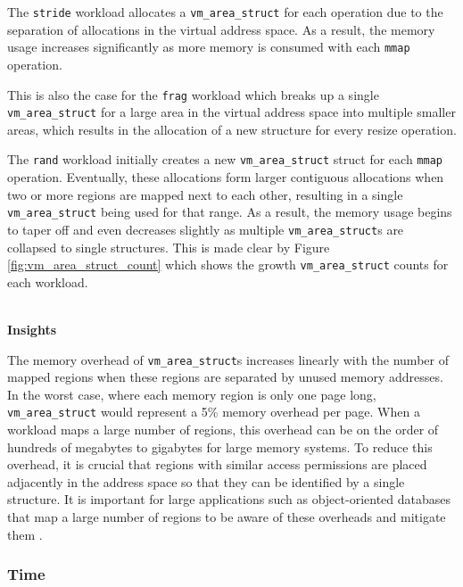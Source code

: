 \documentclass[twocolumn,11pt]{article}
\begin{document}
The \texttt{stride} workload allocates a
\texttt{vm\_area\_struct} for each operation due to the separation of
allocations in the virtual address space. As a result, the memory usage
increases significantly as more memory is consumed with each \texttt{mmap} operation.

This is also the case for the \texttt{frag} workload which breaks up a single
\texttt{vm\_area\_struct} for a large area in the virtual address space into
multiple smaller areas, which results in the allocation of a new structure for
every resize operation. 

The \texttt{rand} workload initially creates a new
\texttt{vm\_area\_struct} struct for each \texttt{mmap} operation. Eventually, these
allocations form larger contiguous allocations when two or more regions are
mapped next to each other, resulting in a single \texttt{vm\_area\_struct} being
used for that range. As a result, the memory usage begins to taper off and
even decreases slightly as multiple \texttt{vm\_area\_struct}s are collapsed to
single structures. This is made clear by Figure \ref{fig:vm_area_struct_count}
which shows the growth \texttt{vm\_area\_struct} counts for each workload.

~\\ \textbf{Insights}

The memory overhead of \texttt{vm\_area\_struct}s increases linearly with the
number of mapped regions when these regions are separated by unused memory
addresses. In the worst case, where each memory region is only one page long, \texttt{vm\_area\_struct} would represent a 5\% memory overhead per page. When a workload maps a large number of regions, this overhead can be
on the order of hundreds of megabytes to gigabytes for large memory systems.  To
reduce this overhead, it is crucial that regions with similar access permissions
are placed adjacently in the address space so that they can be identified by a
single structure. It is important for large applications such as object-oriented
databases that map a large number of regions to be aware of these overheads and mitigate them \cite{utlk}.

\subsubsection{Time}
\end{document}
